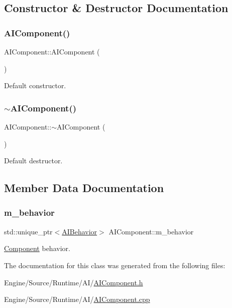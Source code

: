 \subsection{Constructor \& Destructor Documentation}
\mbox{\label{class_a_i_component_ac0e093b9d74e3a103d93d843a1795a95}} 
\subsubsection{\texorpdfstring{A\+I\+Component()}{AIComponent()}}
{\footnotesize\ttfamily A\+I\+Component\+::\+A\+I\+Component (\begin{DoxyParamCaption}{ }\end{DoxyParamCaption})}

Default constructor. \mbox{\label{class_a_i_component_a0ffc6db0d1cb5720b8aaef8ec28f4efe}} 
\subsubsection{\texorpdfstring{$\sim$\+A\+I\+Component()}{~AIComponent()}}
{\footnotesize\ttfamily A\+I\+Component\+::$\sim$\+A\+I\+Component (\begin{DoxyParamCaption}{ }\end{DoxyParamCaption})}

Default destructor. 

\subsection{Member Data Documentation}
\mbox{\label{class_a_i_component_a39ced78aec7dc4cce01017ad2dfb06ea}} 
\subsubsection{\texorpdfstring{m\+\_\+behavior}{m\_behavior}}
{\footnotesize\ttfamily std\+::unique\+\_\+ptr$<$\mbox{\hyperlink{class_a_i_behavior}{A\+I\+Behavior}}$>$ A\+I\+Component\+::m\+\_\+behavior}

\mbox{\hyperlink{class_component}{Component}} behavior. 

The documentation for this class was generated from the following files\+:\begin{DoxyCompactItemize}
\item 
Engine/\+Source/\+Runtime/\+A\+I/\mbox{\hyperlink{_a_i_component_8h}{A\+I\+Component.\+h}}\item 
Engine/\+Source/\+Runtime/\+A\+I/\mbox{\hyperlink{_a_i_component_8cpp}{A\+I\+Component.\+cpp}}\end{DoxyCompactItemize}
